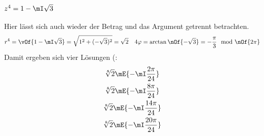 \documentclass[11pt,a4paper]{scrartcl}
\begin{document}
	\subsection{$z^4 = 1 - \mI \sqrt{3}$}
	Hier lässt sich auch wieder der Betrag und das Argument getrennt betrachten.
	\begin{equation}
		r^4 = \vOf{1-\mI\sqrt{3}} = \sqrt{1^2 + (-\sqrt{3})^2} = \sqrt{2} \quad 4\varphi = \arctan\nOf{-\sqrt{3}} = -\frac{\pi}{3} \mod\nOf{2\pi}
	\end{equation}
	Damit ergeben sich vier Lösungen (:
	\begin{gather}
		\sqrt[8]{2} \mE{-\mI\frac{2\pi}{24}} \\
		\sqrt[8]{2} \mE{-\mI\frac{8\pi}{24}} \\
		\sqrt[8]{2} \mE{-\mI\frac{14\pi}{24}} \\
		\sqrt[8]{2} \mE{-\mI\frac{20\pi}{24}} \\
	\end{gather}
\end{document}
